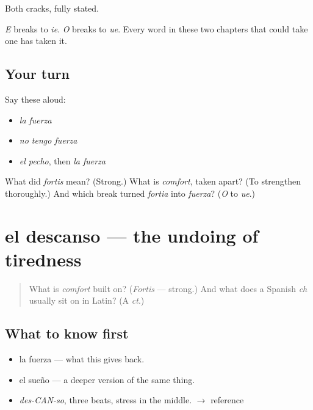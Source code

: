 \begin{grammarlens}[title={What you've built}]
Both cracks, fully stated.

\emph{E} breaks to \emph{ie}. \emph{O} breaks to \emph{ue}. Every word in these two chapters that could take one has taken it.
\end{grammarlens}

\subsection*{Your turn}
Say these aloud:

\begin{itemize}
\raggedright
  \item \emph{la fuerza}
  \item \emph{no tengo fuerza}
  \item \emph{el pecho}, then \emph{la fuerza}
\end{itemize}

\begin{tcolorbox}[breakable,colback=teal!4,colframe=teal!35!black,title={Before you move on}]
What did \emph{fortis} mean? (Strong.) What is \emph{comfort}, taken apart? (To strengthen thoroughly.) And which break turned \emph{fortia} into \emph{fuerza}? (\emph{O} to \emph{ue}.)
\end{tcolorbox}
\section[el descanso]{el descanso — the undoing of tiredness}

\label{lesson:ES-C315-descanso}



\begin{quote}
What is \emph{comfort} built on? (\emph{Fortis} — strong.) And what does a Spanish \emph{ch} usually sit on in Latin? (A \emph{ct}.)
\end{quote}

\subsection*{What to know first}
\begin{itemize}
\raggedright
  \item la fuerza — what this gives back.
  \item el sueño — a deeper version of the same thing.
\end{itemize}

\begin{sounds}
\begin{itemize}
\raggedright
  \item \emph{des-CAN-so}, three beats, stress in the middle. $\to$ reference
\end{itemize}
\end{sounds}

